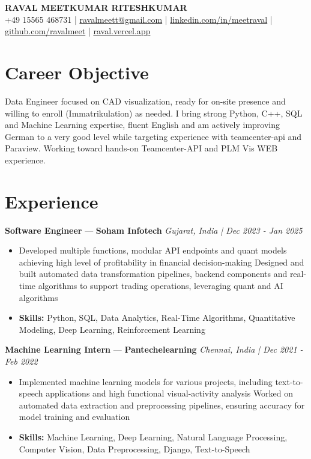 \documentclass[a4paper,10pt]{article}
\begin{document}
\begin{center}
  {\Large\bfseries RAVAL MEETKUMAR RITESHKUMAR}\\[2pt]
  {\small +49 15565 468731 \;|\; \href{mailto:ravalmeett@gmail.com}{ravalmeett@gmail.com} \;|\; \href{https://www.linkedin.com/in/meetraval/}{linkedin.com/in/meetraval} \;|\; \href{https://github.com/ravalmeet}{github.com/ravalmeet} \;|\; \href{https://raval.vercel.app/}{raval.vercel.app}}
\end{center}
\vspace{-3pt}

\section*{Career Objective}
Data Engineer focused on CAD visualization, ready for on-site presence and willing to enroll (Immatrikulation) as needed. I bring strong Python, C++, SQL and Machine Learning expertise, fluent English and am actively improving German to a very good level while targeting experience with teamcenter-api and Paraview. Working toward hands-on Teamcenter-API and PLM Vis WEB experience.\par

\section*{Experience}
\textbf{Software Engineer} — \textbf{Soham Infotech} \hfill \textit{Gujarat, India \;|\; Dec 2023 - Jan 2025}\par
\vspace{1pt}
\begin{itemize}
  \item Developed multiple functions, modular API endpoints and quant models achieving high level of profitability in financial decision-making Designed and built automated data transformation pipelines, backend components and real-time algorithms to support trading operations, leveraging quant and AI algorithms
  \item \textbf{Skills:} Python, SQL, Data Analytics, Real-Time Algorithms, Quantitative Modeling, Deep Learning, Reinforcement Learning
\end{itemize}
\vspace{3pt}
\textbf{Machine Learning Intern} — \textbf{Pantechelearning} \hfill \textit{Chennai, India \;|\; Dec 2021 - Feb 2022}\par
\vspace{1pt}
\begin{itemize}
  \item Implemented machine learning models for various projects, including text-to-speech applications and high functional visual-activity analysis Worked on automated data extraction and preprocessing pipelines, ensuring accuracy for model training and evaluation
  \item \textbf{Skills:} Machine Learning, Deep Learning, Natural Language Processing, Computer Vision, Data Preprocessing, Django, Text-to-Speech
\end{itemize}
\end{document}
